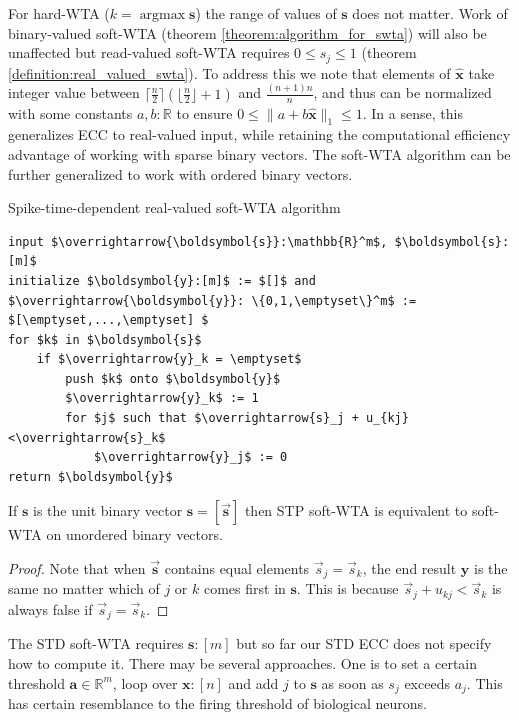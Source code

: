 \documentclass[oneside,english,logo]{amuthesis}
\DeclareMathOperator*{\argmax}{argmax}
\begin{document}
For hard-WTA ($k = \argmax \boldsymbol{s}$) the range of values of $\boldsymbol{s}$ does not matter. Work of binary-valued soft-WTA (theorem \ref{theorem:algorithm_for_swta}) will also be unaffected but read-valued soft-WTA 
requires $0 \le s_j \le 1$ (theorem \ref{definition:real_valued_swta}). To address this we note that elements of $\hat{\boldsymbol{x}}$ take integer value between $\lceil \frac{n}{2} \rceil  (\lfloor \frac{n}{2} \rfloor + 1)$ and $\frac{(n+1)n}{n}$, and thus can be normalized with some constants $a,b:\mathbb{R}$ to ensure $0 \le \lVert a + b \hat{\boldsymbol{x}} \lVert_1 \le 1$. In a sense, this generalizes ECC to real-valued input, while retaining the computational efficiency advantage of working with sparse binary vectors. The soft-WTA algorithm can be further generalized to work with ordered binary vectors.
\begin{definition}
Spike-time-dependent real-valued soft-WTA algorithm
\begin{lstlisting}
input $\overrightarrow{\boldsymbol{s}}:\mathbb{R}^m$, $\boldsymbol{s}:[m]$
initialize $\boldsymbol{y}:[m]$ := $[]$ and $\overrightarrow{\boldsymbol{y}}: \{0,1,\emptyset\}^m$ := $[\emptyset,...,\emptyset] $ 
for $k$ in $\boldsymbol{s}$
    if $\overrightarrow{y}_k = \emptyset$
        push $k$ onto $\boldsymbol{y}$
        $\overrightarrow{y}_k$ := 1
        for $j$ such that $\overrightarrow{s}_j + u_{kj}<\overrightarrow{s}_k$
            $\overrightarrow{y}_j$ := 0 
return $\boldsymbol{y}$
\end{lstlisting}
\end{definition}
\begin{lemma}
If $\boldsymbol{s}$ is the unit binary vector $\boldsymbol{s}=[\overrightarrow{\boldsymbol{s}}]$ then STP soft-WTA is equivalent to soft-WTA on unordered binary vectors. 
\end{lemma}
\begin{proof}
Note that when $\overrightarrow{\boldsymbol{s}}$ contains equal elements $\overrightarrow{s}_j =\overrightarrow{s}_k$, the end result $\boldsymbol{y}$ is the same no matter which of $j$ or $k$ comes first in $\boldsymbol{s}$. This is  because $\overrightarrow{s}_j + u_{kj}<\overrightarrow{s}_k$ is always false if $\overrightarrow{s}_j =\overrightarrow{s}_k$. 
\end{proof}

The STD soft-WTA requires $\boldsymbol{s}:[m]$ but so far our STD ECC does not specify how to compute it. There may be several approaches. One is to set a certain threshold $\boldsymbol{a}\in \mathbb{R}^m$, loop over $\boldsymbol{x}:[n]$ and add $j$ to $\boldsymbol{s}$ as soon as $s_j$ exceeds $a_j$. This has certain resemblance to the firing threshold of biological neurons. 
\end{document}
